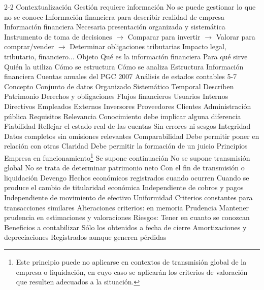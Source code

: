 \documentclass{nuevotema}
\begin{document}
\begin{esquemal}
	\1[]  2-2
		\2 Contextualización
			\3 Gestión requiere información
				\4 No se puede gestionar lo que no se conoce
				\4 Información financiera para describir realidad de empresa
			\3 Información financiera
				\4 Necesaria presentación organizada y sistemática
				\4 Instrumento de toma de decisiones
				\4 $\to$ Comparar para invertir
				\4 $\to$ Valorar para comprar/vender
				\4 $\to$ Determinar obligaciones  tributarias
				\4 Impacto legal, tributario, financiero...
		\2 Objeto
			\3 Qué es la información financiera
			\3 Para qué sirve
			\3 Quién la utiliza
			\3 Cómo se estructura
			\3 Cómo se analiza
		\2 Estructura
			\3 Información financiera
			\3 Cuentas anuales del PGC 2007
			\3 Análisis de estados contables
	\1  5-7
		\2 Concepto
			\3 Conjunto de datos
				\4 Organizado
				\4 Sistemático
				\4 Temporal
			\3 Describen
				\4 Patrimonio
				\4 Derechos y obligaciones
				\4 Flujos financieros
		\2 Usuarios
			\3 Internos
				\4 Directivos
				\4 Empleados
			\3 Externos
				\4 Inversores
				\4 Proveedores
				\4 Clientes
				\4 Administración pública
		\2 Requisitos
			\3 Relevancia
				\4 Conocimiento debe implicar alguna diferencia
			\3 Fiabilidad
				\4 Reflejar el estado real de las cuentas
				\4 Sin errores ni sesgos
			\3 Integridad
				\4 Datos completos sin omisiones relevantes
			\3 Comparabilidad
				\4 Debe permitir poner en relación con otras
			\3 Claridad
				\4 Debe permitir la formación de un juicio
		\2 Principios
			\3 Empresa en funcionamiento\footnote{Este principio puede no aplicarse en contextos de transmisión global de la empresa o liquidación, en cuyo caso se aplicarán los criterios de valoración que resulten adecuados a la situación.}
				\4 Se supone continuación
				\4 No se supone transmisión global
				\4 No se trata de determinar patrimonio neto
				\4[] Con el fin de transmisión o liquidación
			\3 Devengo
				\4 Hechos económicos registrados cuando ocurren
				\4[] Cuando se produce el cambio de titularidad económica
				\4 Independiente de cobros y pagos
				\4[] Independiente de movimiento de efectivo
			\3 Uniformidad
				\4 Criterios constantes para transacciones similares
				\4 Alteraciones criterios: en memoria
			\3 Prudencia
				\4 Mantener prudencia en estimaciones y valoraciones
				\4 Riesgos:
				\4[] Tener en cuanto se conozcan
				\4 Beneficios a contabilizar
				\4[] Sólo los obtenidos a fecha de cierre
				\4 Amortizaciones y depreciaciones
				\4[] Registrados aunque generen pérdidas

\end{esquemal}
\end{document}
